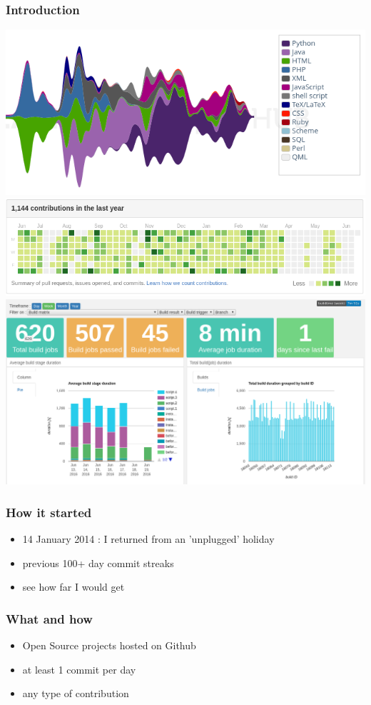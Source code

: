 \documentclass[14pt]{beamer}
\begin{document}
  \begin{frame}
    \frametitle{Introduction}
    \includegraphics[scale=.3]{openhub.png}
    \includegraphics[scale=.3]{github_19jun2016.png}\\
    \includegraphics[scale=.3]{screenshot_buildtimetrend.png}
  \end{frame}
  \begin{frame}
    \frametitle{How it started}
    \begin{itemize}
      \item 14 January 2014 : I returned from an 'unplugged' holiday
      \item previous 100+ day commit streaks
      \item see how far I would get
    \end{itemize}
  \end{frame}
  \begin{frame}
    \frametitle{What and how}
    \begin{itemize}
      \item Open Source projects hosted on Github
      \item at least 1 commit per day
      \item any type of contribution
    \end{itemize}
  \end{frame}
\end{document}
